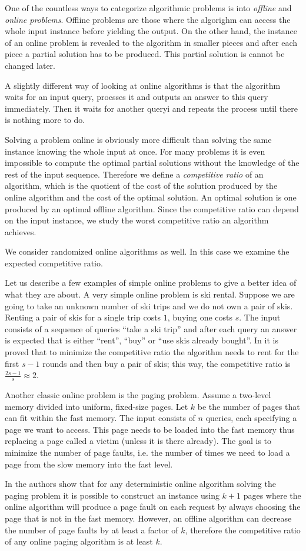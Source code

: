 One of the countless ways to categorize algorithmic problems is into
\emph{offline} and \emph{online problems}. Offline problems are those
where the algorighm can access the whole input instance before yielding
the output.  On the other hand, the instance of an online problem is
revealed to the algorithm in smaller pieces and after each piece a partial
solution has to be produced. This partial solution is cannot be changed
later.

A slightly different way of looking at online algorithms is that the
algorithm waits for an input query, procsses it and outputs an answer to
this query immediately. Then it waits for another queryi and repeats the
process until there is nothing more to do.

Solving a problem online is obviously more difficult than solving the same
instance knowing the whole input at once. For many problems it is even
impossible to compute the optimal partial solutions without the knowledge
of the rest of the input sequence. Therefore we define a \emph{competitive
ratio} of an algorithm, which is the quotient of the cost of the solution
produced by the online algorithm and the cost of the optimal solution. An
optimal solution is one produced by an optimal offline algorithm. Since
the competitive ratio can depend on the input instance, we study the worst
competitive ratio an algorithm achieves.

We consider randomized online algorithms as well. In this case we examine
the expected competitive ratio.

Let us describe a few examples of simple online problems to give a better
idea of what they are about. A very simple online problem is ski rental.
Suppose we are going to take an unknown number of ski trips and we do not
own a pair of skis. Renting a pair of skis for a single trip costs $1$,
buying one costs $s$. The input consists of a sequence of queries ``take a
ski trip'' and after each query an answer is expected that is either
``rent'', ``buy'' or ``use skis already bought''. In \cite{skirental} it
is proved that to minimize the competitive ratio the algorithm needs to
rent for the first $s-1$ rounds and then buy a pair of skis; this way, the
competitive ratio is $\frac{2s-1}{s} \approx 2$.

Another classic online problem is the paging problem. Assume a two-level
memory divided into uniform, fixed-size pages. Let $k$ be the number of
pages that can fit within the fast memory. The input consists of $n$
queries, each specifying a page we want to access. This page needs to be
loaded into the fast memory thus replacing a page called a victim (unless
it is there already). The goal is to minimize the number of page faults,
i.e. the number of times we need to load a page from the slow memory into
the fast level.

In \cite{paging-deterministic} the authors show that for any deterministic
online algorithm solving the paging problem it is possible to construct an
instance using $k + 1$ pages where the online algorithm will produce a
page fault on each request by always choosing the page that is not in the
fast memory. However, an offline algorithm can decrease the number of page
faults by at least a factor of $k$, therefore the competitive ratio of any
online paging algorithm is at least $k$.
